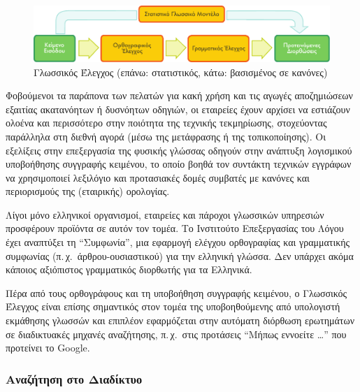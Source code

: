\begin{multicols}{2}
\begin{figure}[htb]
  \center
  \includegraphics[width=\textwidth]{../_media/greek/language_checking}
  \caption{Γλωσσικός Έλεγχος (επάνω: στατιστικός, κάτω: βασισμένος σε κανόνες)}
  \label{fig:langcheckingaarch_de}
\end{figure}

Φοβούμενοι τα παράπονα των πελατών για κακή χρήση και τις αγωγές αποζημιώσεων εξαιτίας ακατανόητων ή δυσνόητων οδηγιών, οι εταιρείες έχουν αρχίσει να εστιάζουν ολοένα και περισσότερο  στην ποιότητα της τεχνικής τεκμηρίωσης, στοχεύοντας παράλληλα στη διεθνή αγορά (μέσω της μετάφρασης ή της τοπικοποίησης). Οι εξελίξεις στην επεξεργασία της φυσικής γλώσσας οδηγούν στην ανάπτυξη λογισμικού υποβοήθησης συγγραφής κειμένου, το οποίο βοηθά τον συντάκτη τεχνικών εγγράφων να χρησιμοποιεί λεξιλόγιο και προτασιακές δομές  συμβατές με κανόνες και περιορισμούς της  (εταιρικής) ορολογίας. 

Λίγοι μόνο ελληνικοί οργανισμοί, εταιρείες και πάροχοι γλωσσικών υπηρεσιών προσφέρουν προϊόντα σε αυτόν τον τομέα. Το Ινστιτούτο Επεξεργασίας του Λόγου έχει αναπτύξει τη “Συμφωνία”, μια εφαρμογή ελέγχου ορθογραφίας και γραμματικής συμφωνίας (π.\,χ.~άρθρου-ουσιαστικού)  για την ελληνική γλώσσα. Δεν υπάρχει ακόμα κάποιος αξιόπιστος γραμματικός διορθωτής για τα Ελληνικά.

Πέρα από τους ορθογράφους και τη υποβοήθηση συγγραφής κειμένου, ο Γλωσσικός Έλεγχος είναι επίσης σημαντικός στον τομέα της υποβοηθούμενης από υπολογιστή εκμάθησης γλωσσών και επιπλέον εφαρμόζεται στην αυτόματη διόρθωση ερωτημάτων σε διαδικτυακές μηχανές αναζήτησης, π.\,χ.~στις προτάσεις ``Μήπως εννοείτε \dots'' που προτείνει το Google.

\subsubsection{Αναζήτηση στο Διαδίκτυο}


\end{multicols}
